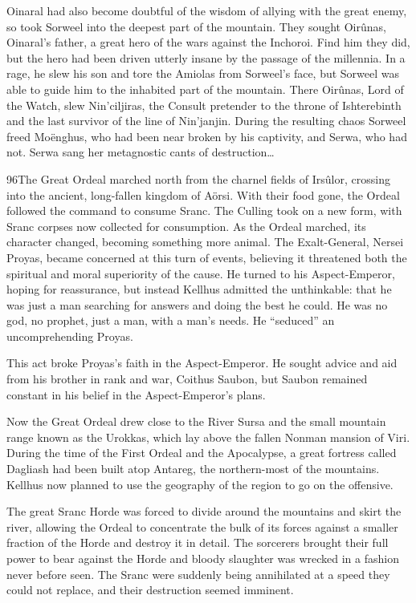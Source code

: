 \documentclass[]{book}
\begin{document}
Oinaral had also become doubtful of the wisdom of allying with the great enemy, so
took Sorweel into the deepest part of the mountain. They sought Oirûnas, Oinaral's
father, a great hero of the wars against the Inchoroi. Find him they did, but the hero
had been driven utterly insane by the passage of the millennia. In a rage, he slew his
son and tore the Amiolas from Sorweel's face, but Sorweel was able to guide him to the
inhabited part of the mountain. There Oirûnas, Lord of the Watch, slew Nin'ciljiras,
the Consult pretender to the throne of Ishterebinth and the last survivor of the line of
Nin'janjin. During the resulting chaos Sorweel freed Moënghus, who had been near
broken by his captivity, and Serwa, who had not. Serwa sang her metagnostic cants of
destruction\ldots{}

96The Great Ordeal marched north from the charnel fields of Irsûlor, crossing into the
ancient, long-fallen kingdom of Aörsi. With their food gone, the Ordeal followed the
command to consume Sranc. The Culling took on a new form, with Sranc corpses now
collected for consumption. As the Ordeal marched, its character changed, becoming
something more animal. The Exalt-General, Nersei Proyas, became concerned at this
turn of events, believing it threatened both the spiritual and moral superiority of the
cause. He turned to his Aspect-Emperor, hoping for reassurance, but instead Kellhus
admitted the unthinkable: that he was just a man searching for answers and doing the
best he could. He was no god, no prophet, just a man, with a man's needs. He
``seduced'' an uncomprehending Proyas.

This act broke Proyas's faith in the Aspect-Emperor. He sought advice and aid from his
brother in rank and war, Coithus Saubon, but Saubon remained constant in his belief
in the Aspect-Emperor's plans.

Now the Great Ordeal drew close to the River Sursa and the small mountain range
known as the Urokkas, which lay above the fallen Nonman mansion of Viri. During
the time of the First Ordeal and the Apocalypse, a great fortress called Dagliash had
been built atop Antareg, the northern-most of the mountains. Kellhus now planned to
use the geography of the region to go on the offensive.

The great Sranc Horde was forced to divide around the mountains and skirt the river,
allowing the Ordeal to concentrate the bulk of its forces against a smaller fraction of
the Horde and destroy it in detail. The sorcerers brought their full power to bear
against the Horde and bloody slaughter was wrecked in a fashion never before seen.
The Sranc were suddenly being annihilated at a speed they could not replace, and their
destruction seemed imminent.
\end{document}

